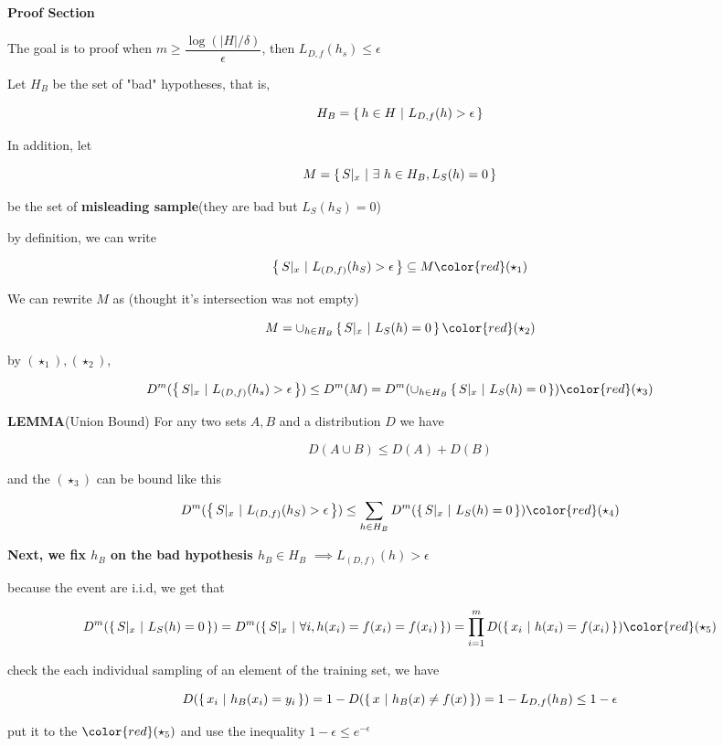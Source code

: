 \textbf{Proof Section}

The goal is to proof when $m \geq \dfrac{\log(|H|/\delta)}{\epsilon}$, then $L_{D,f}(h_s) \leq \epsilon$

Let $H_B$ be the set of "bad" hypotheses, that is,

$$H_B = \left\{ \,h \in H~|~L_{D,f}(h)>\epsilon \,\right\}$$

In addition, let

$$M = \left\{ \,S|_x ~|~ \exists~h \in H_B,L_S(h) = 0 \,\right\}$$

be the set of \textbf{misleading sample}(they are bad but $L_S(h_S) = 0$)

\newpage

by definition, we can write 

$$\sett{S|_x ~|~ L_{(D,f)}(h_S) > \epsilon} \subseteq M\color{red}(\star_1) $$


We can rewrite $M$ as (thought it's intersection was not empty)

$$M = \cup_{h \in H_B}\sett{S|_x ~|~ L_S(h) = 0}\color{red}(\star_2)$$

by $(\star_1),(\star_2)$,

$$D^m(\sett{S|_x~|~L_{(D,f)}(h_s)>\epsilon}) \leq D^m(M) = D^m(\cup_{h\in H_B}\sett{S|_x ~|~ L_S(h) = 0})\color{red}(\star_3)$$


\textbf{LEMMA}(Union Bound) For any two sets $A,B$ and a distribution $D$ we have

$$D(A\cup B) \leq D(A) + D(B)$$

and the $(\star_3)$ can be bound like this

$$D^m(\sett{S|_x ~|~ L_{(D,f)}(h_S)>\epsilon}) \leq \sum_{h \in H_B}D^m(\sett{S|_x ~|~ L_S(h) = 0})\color{red}(\star_4)$$

\textbf{Next, we fix $h_B$ on the bad hypothesis $h_B \in H_B$} $\implies L_{(D,f)}(h) > \epsilon$

because the event are i.i.d, we get that

$$D^m(\sett{S|_x~|~L_S(h)=0}) = D^m(\sett{S|_x ~|~\forall i,h(x_i) = f(x_i) = f(x_i)}) = \prod^m_{i=1}D(\sett{x_i~|~h(x_i) = f(x_i)})\color{red}(\star_5)$$



check the each individual sampling of an element of the training set, we have

$$D(\left\{ \,x_i~|~h_B(x_i) = y_i \,\right\}) = 1-D(\left\{ \,x ~|~ h_B(x) \neq f(x) \,\right\})=1 - L_{D,f}(h_B) \leq 1 - \epsilon$$

put it to the $\color{red}(\star_5)$ and use the inequality $1 - \epsilon \leq e^{-\epsilon}$

